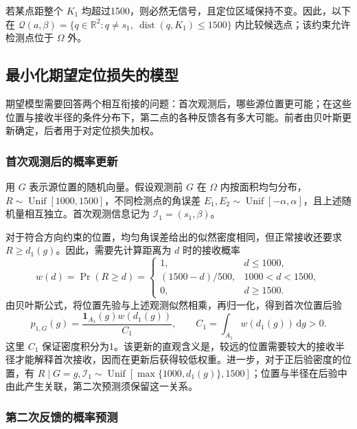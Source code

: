 \documentclass[UTF8,a4paper,zihao=-4,fontset=none]{ctexart}
\begin{document}
若某点距整个 \(K_1\) 均超过1500，则必然无信号，且定位区域保持不变。因此，以下在 \(\mathcal Q(a,\beta)=\{q\in\mathbb R^2:q\ne s_1,\ \operatorname{dist}(q,K_1)\le1500\}\) 内比较候选点；该约束允许检测点位于 \(\Omega\) 外。

\subsection{最小化期望定位损失的模型}

期望模型需要回答两个相互衔接的问题：首次观测后，哪些源位置更可能；在这些位置与接收半径的条件分布下，第二点的各种反馈各有多大可能。前者由贝叶斯更新确定，后者用于对定位损失加权。

\subsubsection{首次观测后的概率更新}

用 \(G\) 表示源位置的随机向量。假设观测前 \(G\) 在 \(\Omega\) 内按面积均匀分布，\(R\sim\operatorname{Unif}[1000,1500]\)，不同检测点的角误差 \(E_1,E_2\sim\operatorname{Unif}[-\alpha,\alpha]\)，且上述随机量相互独立。首次观测信息记为 \(\mathcal I_1=(s_1,\beta)\)。

对于符合方向约束的位置，均匀角误差给出的似然密度相同，但正常接收还要求 \(R\ge d_1(g)\)。因此，需要先计算距离为 \(d\) 时的接收概率
\begin{equation}
 w(d)=\Pr(R\ge d)=
 \begin{cases}
 1,&d\le1000,\\
 (1500-d)/500,&1000<d<1500,\\
 0,&d\ge1500.
 \end{cases}
\label{eq:q2-pair-weight}
\end{equation}
由贝叶斯公式，将位置先验与上述观测似然相乘，再归一化，得到首次位置后验
\begin{equation}
 p_{1,G}(g)=\frac{\mathbf1_{A_1}(g)w(d_1(g))}{C_1},
 \qquad C_1=\int_{A_1}w(d_1(g))\,\mathrm dg>0.
\label{eq:q2-pair-posterior}
\end{equation}
这里 \(C_1\) 保证密度积分为1。该更新的直观含义是，较远的位置需要较大的接收半径才能解释首次接收，因而在更新后获得较低权重。进一步，对于正后验密度的位置，有 \(R\mid G=g,\mathcal I_1\sim\operatorname{Unif}[\max\{1000,d_1(g)\},1500]\)；位置与半径在后验中由此产生关联，第二次预测须保留这一关系。

\subsubsection{第二次反馈的概率预测}
\end{document}
